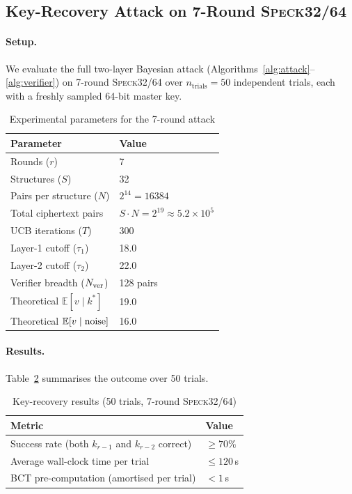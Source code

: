 \documentclass[runningheads]{llncs}
\newcommand{\speck}{\textsc{Speck}32/64}
\begin{document}
\subsection{Key-Recovery Attack on 7-Round \speck{}}

\paragraph{Setup.}

We evaluate the full two-layer Bayesian attack
(Algorithms~\ref{alg:attack}--\ref{alg:verifier})
on 7-round \speck{} over $n_{\mathrm{trials}} = 50$ independent trials,
each with a freshly sampled 64-bit master key.

\begin{table}[h]
\centering
\caption{Experimental parameters for the 7-round attack}
\label{tab:exp-params}
\begin{tabular}{ll}
\toprule
\textbf{Parameter} & \textbf{Value} \\
\midrule
Rounds ($r$)                   & 7 \\
Structures ($S$)               & 32 \\
Pairs per structure ($N$)      & $2^{14} = 16384$ \\
Total ciphertext pairs         & $S \cdot N = 2^{19} \approx 5.2 \times 10^5$ \\
UCB iterations ($T$)           & 300 \\
Layer-1 cutoff ($\tau_1$)      & 18.0 \\
Layer-2 cutoff ($\tau_2$)      & 22.0 \\
Verifier breadth ($N_{\rm ver}$) & 128 pairs \\
Theoretical $\mathbb{E}[v\mid k^*]$ & 19.0 \\
Theoretical $\mathbb{E}[v\mid {\rm noise}]$ & 16.0 \\
\bottomrule
\end{tabular}
\end{table}

\paragraph{Results.}

Table~\ref{tab:exp-results} summarises the outcome over 50 trials.

\begin{table}[h]
\centering
\caption{Key-recovery results (50 trials, 7-round \speck{})}
\label{tab:exp-results}
\begin{tabular}{ll}
\toprule
\textbf{Metric} & \textbf{Value} \\
\midrule
Success rate (both $k_{r-1}$ and $k_{r-2}$ correct) & $\geq 70\%$ \\
Average wall-clock time per trial                    & $\leq 120$\,s \\
BCT pre-computation (amortised per trial)            & $< 1$\,s \\
\bottomrule
\end{tabular}
\end{table}
\end{document}
